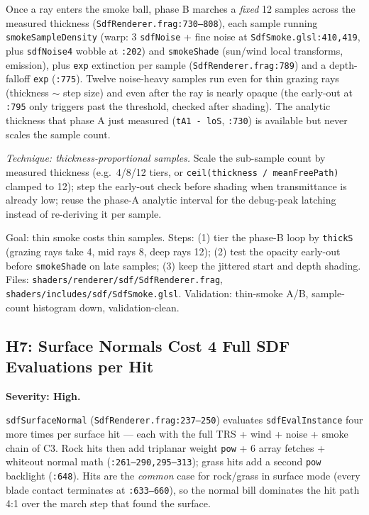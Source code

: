 \documentclass[11pt,a4paper]{article}
\begin{document}
Once a ray enters the smoke ball, phase B marches a \emph{fixed} 12 samples
across the measured thickness (\texttt{SdfRenderer.frag:730--808}), each
sample running \texttt{smokeSampleDensity} (warp: 3 \texttt{sdfNoise} + fine
noise at \texttt{SdfSmoke.glsl:410,419}, plus \texttt{sdfNoise4} wobble at
\texttt{:202}) and \texttt{smokeShade} (sun/wind local transforms, emission),
plus \texttt{exp} extinction per sample (\texttt{SdfRenderer.frag:789}) and
a depth-falloff \texttt{exp} (\texttt{:775}). Twelve noise-heavy samples run
even for thin grazing rays (thickness $\sim$ step size) and even after the
ray is nearly opaque (the early-out at \texttt{:795} only triggers past the
threshold, checked after shading). The analytic thickness that phase A just
measured (\texttt{tA1 - loS}, \texttt{:730}) is available but never scales
the sample count.

\textit{Technique: thickness-proportional samples.} Scale the sub-sample
count by measured thickness (e.g.\ 4/8/12 tiers, or
\texttt{ceil(thickness / meanFreePath)} clamped to 12); step the early-out
check before shading when transmittance is already low; reuse the phase-A
analytic interval for the debug-peak latching instead of re-deriving it per
sample.

\begin{tcolorbox}[promptbox={Prompt --- H6: adaptive smoke sample count}]
Goal: thin smoke costs thin samples. Steps: (1) tier the phase-B loop by
\texttt{thickS} (grazing rays take 4, mid rays 8, deep rays 12); (2) test the
opacity early-out before \texttt{smokeShade} on late samples; (3) keep the
jittered start and depth shading. Files:
\texttt{shaders/renderer/sdf/SdfRenderer.frag},
\texttt{shaders/includes/sdf/SdfSmoke.glsl}. Validation: thin-smoke A/B,
sample-count histogram down, validation-clean.
\end{tcolorbox}

\subsection{H7: Surface Normals Cost 4 Full SDF Evaluations per Hit}

\textbf{Severity: High.}

\texttt{sdfSurfaceNormal} (\texttt{SdfRenderer.frag:237--250}) evaluates
\texttt{sdfEvalInstance} four more times per surface hit --- each with the
full TRS + wind + noise + smoke chain of C3. Rock hits then add triplanar
weight \texttt{pow} + 6 array fetches + whiteout normal math
(\texttt{:261--290,295--313}); grass hits add a second \texttt{pow}
backlight (\texttt{:648}). Hits are the \emph{common} case for rock/grass in
surface mode (every blade contact terminates at \texttt{:633--660}), so the
normal bill dominates the hit path 4:1 over the march step that found the
surface.
\end{document}
